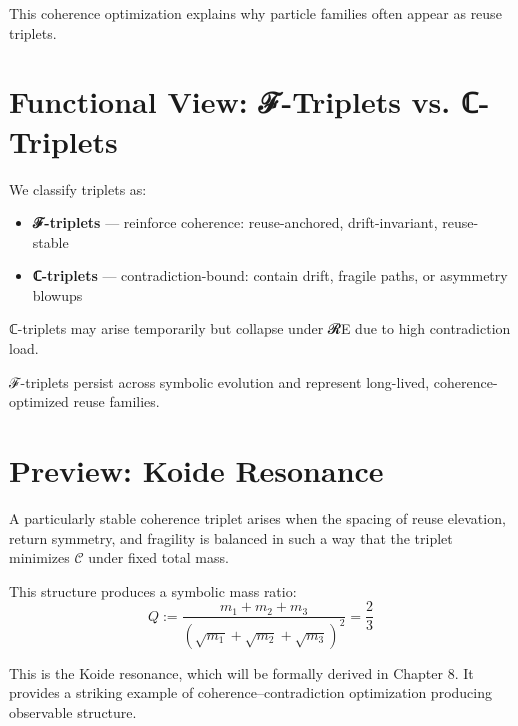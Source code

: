 This coherence optimization explains why particle families often appear as reuse triplets.

\section{Functional View: ℱ-Triplets vs. ℂ-Triplets} \label{sec:triplet-functional-classes}

We classify triplets as:

\begin{itemize}
    \item \textbf{ℱ-triplets} — reinforce coherence: reuse-anchored, drift-invariant, reuse-stable
    \item \textbf{ℂ-triplets} — contradiction-bound: contain drift, fragile paths, or asymmetry blowups
\end{itemize}

ℂ-triplets may arise temporarily but collapse under 𝓡E due to high contradiction load.

ℱ-triplets persist across symbolic evolution and represent long-lived, coherence-optimized reuse families.

\section{Preview: Koide Resonance} \label{sec:triplet-koide-preview}

A particularly stable coherence triplet arises when the spacing of reuse elevation, return symmetry, and fragility is balanced in such a way that the triplet minimizes $\mathcal{C}$ under fixed total mass.

This structure produces a symbolic mass ratio:
\[
Q := \frac{m_1 + m_2 + m_3}{\left(\sqrt{m_1} + \sqrt{m_2} + \sqrt{m_3}\right)^2} = \frac{2}{3}
\]

This is the Koide resonance, which will be formally derived in Chapter 8. It provides a striking example of coherence–contradiction optimization producing observable structure.
